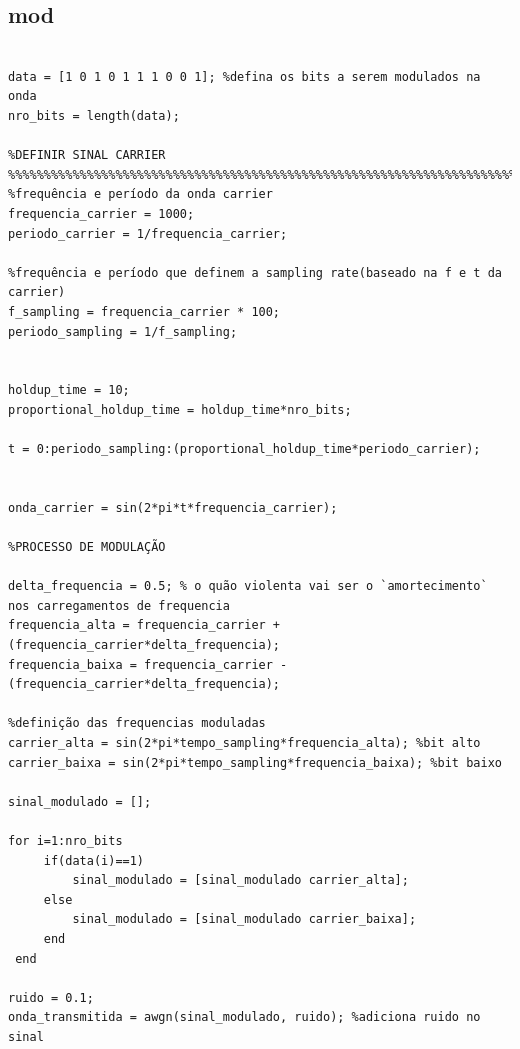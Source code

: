 \documentclass[11pt,a4paper]{report}
\begin{document}
\subsection{mod}
	\begin{verbatim}

data = [1 0 1 0 1 1 1 0 0 1]; %defina os bits a serem modulados na onda
nro_bits = length(data);

%DEFINIR SINAL CARRIER
%%%%%%%%%%%%%%%%%%%%%%%%%%%%%%%%%%%%%%%%%%%%%%%%%%%%%%%%%%%%%%%%%%%%%%%%%%%%%%
%frequência e período da onda carrier
frequencia_carrier = 1000; 
periodo_carrier = 1/frequencia_carrier;

%frequência e período que definem a sampling rate(baseado na f e t da carrier)
f_sampling = frequencia_carrier * 100;
periodo_sampling = 1/f_sampling;


holdup_time = 10;
proportional_holdup_time = holdup_time*nro_bits;

t = 0:periodo_sampling:(proportional_holdup_time*periodo_carrier);


onda_carrier = sin(2*pi*t*frequencia_carrier); 

%PROCESSO DE MODULAÇÃO

delta_frequencia = 0.5; % o quão violenta vai ser o `amortecimento` nos carregamentos de frequencia
frequencia_alta = frequencia_carrier + (frequencia_carrier*delta_frequencia);
frequencia_baixa = frequencia_carrier - (frequencia_carrier*delta_frequencia);

%definição das frequencias moduladas
carrier_alta = sin(2*pi*tempo_sampling*frequencia_alta); %bit alto
carrier_baixa = sin(2*pi*tempo_sampling*frequencia_baixa); %bit baixo

sinal_modulado = [];

for i=1:nro_bits
     if(data(i)==1)
         sinal_modulado = [sinal_modulado carrier_alta];
     else
         sinal_modulado = [sinal_modulado carrier_baixa];
     end
 end

ruido = 0.1;
onda_transmitida = awgn(sinal_modulado, ruido); %adiciona ruido no sinal
\end{verbatim}

	
\end{document}
